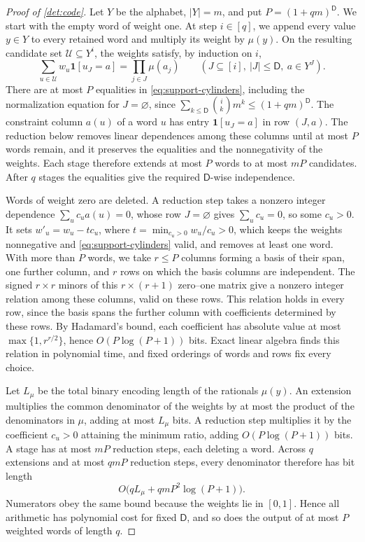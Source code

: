 \documentclass[11pt,letterpaper]{article} \usepackage[utf8]{inputenc}
\theoremstyle{plain} \newtheorem{theorem}{Theorem}[section]
\theoremstyle{definition} \newaliascnt{definition}{theorem}
\newcommand{\ind}{\mathbf{1}}
\begin{document}
\begin{proof}[Proof of \cref{det:code}]
\label{proof:det:code}
Let $Y$ be the alphabet, $|Y|=m$, and put $P=(1+qm)^{\mathsf D}$. We start
with the empty word of weight one. At step $i\in[q]$, we append every
value $y\in Y$ to every retained word and multiply its weight by $\mu(y)$. On the resulting candidate
set $\mathcal U\subseteq Y^i$, the weights satisfy, by induction on $i$,
\[
\sum_{u\in\mathcal U}w_u\ind[u_J=a]
=\prod_{j\in J}\mu(a_j)
\qquad
(J\subseteq[i],\ |J|\le\mathsf D,\ a\in Y^J).
\tag{*}\label{eq:support-cylinders}
\]
There are at most $P$ equalities in \eqref{eq:support-cylinders}, including
the normalization equation for $J=\varnothing$, since
$\sum_{k\le\mathsf D}\binom ik m^k\le(1+qm)^{\mathsf D}$. The constraint column
$a(u)$ of a word $u$ has entry $\ind[u_J=a]$ in row $(J,a)$. The reduction
below removes linear dependences among these columns until at most
$P$ words remain, and it preserves the equalities and the nonnegativity of the
weights. Each stage therefore extends at most $P$ words to at most $mP$ candidates.
After $q$ stages the equalities give the required $\mathsf D$-wise independence.

Words of weight zero are deleted. A reduction step takes a nonzero integer
dependence $\sum_uc_ua(u)=0$, whose row $J=\varnothing$ gives $\sum_uc_u=0$,
so some $c_u>0$. It sets $w'_u=w_u-tc_u$, where
$t=\min_{c_u>0}w_u/c_u>0$, which keeps the weights nonnegative and
\eqref{eq:support-cylinders} valid, and removes at least one word.
With more than $P$ words, we take $r\le P$
columns forming a basis of their span, one further column, and $r$ rows on
which the basis columns are independent. The signed $r\times r$ minors of
this $r\times(r+1)$ zero--one matrix give a nonzero integer relation among these
columns, valid on these rows. This relation holds in every row, since the basis spans the further column with
coefficients determined by these rows. By Hadamard's bound, each
coefficient has absolute value at most $\max\{1,r^{r/2}\}$, hence $O(P\log(P+1))$ bits. Exact linear
algebra finds this relation in polynomial time, and fixed orderings of words and rows fix every choice.

Let $L_\mu$ be the total binary encoding length of the rationals $\mu(y)$. An extension
multiplies the common denominator of the weights by at most the product of the
denominators in $\mu$, adding at most $L_\mu$ bits. A reduction step multiplies
it by the coefficient $c_u>0$ attaining the minimum ratio, adding
$O(P\log(P+1))$ bits. A stage has at most $mP$ reduction steps, each deleting a word. Across $q$ extensions and at most $qmP$ reduction steps,
every denominator therefore has bit length
\[
O\bigl(qL_\mu+qmP^2\log(P+1)\bigr).
\]
Numerators obey the same bound because the weights lie in $[0,1]$. Hence
all arithmetic has polynomial cost for fixed $\mathsf D$, and so does the
output of at most $P$ weighted words of length $q$.
\end{proof}
\end{document}

